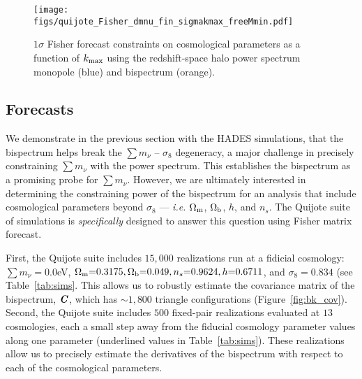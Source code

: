 \documentclass[12pt, letterpaper, preprint]{aastex62}
\newcommand{\Om}{\Omega_{\rm m}}
\newcommand{\Ob}{\Omega_{\rm b}}
\newcommand{\smnu}{\sum m_\nu}
\newcommand{\sig}{\sigma_8}
\newcommand{\bfi}[1]{\textbf{\textit{#1}}}
\begin{document}
\begin{figure}
\begin{center}
    \texttt{[image: figs/quijote\_Fisher\_dmnu\_fin\_sigmakmax\_freeMmin.pdf]} 
    \caption{$1\sigma$ Fisher forecast constraints on cosmological parameters as a function
    of $k_{\rm max}$ using the redshift-space halo power spectrum monopole (blue) and 
    bispectrum (orange). }
\label{fig:pk_fish_kmax}
\end{center}
\end{figure}

\subsection{Forecasts} \label{sec:forecasts}
We demonstrate in the previous section with the HADES simulations, that 
the bispectrum helps break the $\smnu$ -- $\sig$ degeneracy, a major 
challenge in precisely constraining $\smnu$ with the power spectrum. 
This establishes the bispectrum as a promising probe for $\smnu$. However, 
we are ultimately interested in determining the constraining power of the 
bispectrum for an analysis that include cosmological parameters beyond 
$\sig$ --- \emph{i.e.} $\Om$, $\Ob$, $h$, and $n_s$. The Quijote 
suite of simulations is \emph{specifically} designed to answer this question
using Fisher matrix forecast. 

First, the Quijote suite includes $15,000$ realizations run at a fidicial 
cosmology: $\smnu{=}0.0$eV, $\Om{=}0.3175, \Ob{=}0.049, n_s{=}0.9624, h{=}0.6711$, 
and $\sig=0.834$ (see Table~\ref{tab:sims}. This allows us to robustly estimate 
the covariance matrix of the bispectrum, $\bfi{C}$, which has ${\sim}1,800$ 
triangle configurations (Figure~\ref{fig:bk_cov}). Second, the Quijote suite 
includes $500$ fixed-pair realizations evaluated at $13$ cosmologies, each a 
small step away from the fiducial cosmology parameter values along one 
parameter (underlined values in Table~\ref{tab:sims}). These realizations allow us 
to precisely estimate the derivatives of the bispectrum with respect to each 
of the cosmological parameters. 
\end{document}
